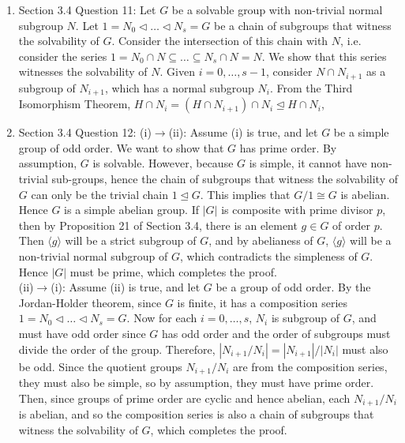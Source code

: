 \documentclass{article}
\begin{document}
\begin{enumerate}
  \item Section 3.4 Question 11: Let $G$ be a solvable group with
    non-trivial normal subgroup $N$. Let
    $1=N_0\triangleleft\ldots\triangleleft N_s=G$ be a chain of subgroups
    that witness the solvability of $G$. Consider the intersection of this
    chain with $N$, i.e. consider the series $1=N_0\cap
    N\subseteq\ldots\subseteq N_s\cap N=N$. We show that this series
    witnesses the solvability of $N$. Given $i=0,\ldots,s-1$, consider
    $N\cap N_{i+1}$ as a subgroup of $N_{i+1}$, which has a normal
    subgroup $N_i$. From the Third Isomorphism Theorem, $H\cap
    N_i=(H\cap N_{i+1})\cap N_i\trianglelefteq H\cap N_i$,

  \item Section 3.4 Question 12: (i)$\rightarrow$(ii): Assume (i) is true,
    and let $G$ be a simple group of odd order. We want to show that $G$
    has prime order. By assumption, $G$ is solvable. However, because $G$
    is simple, it cannot have non-trivial sub-groups, hence the chain of
    subgroups that witness the solvability of $G$ can only be the trivial
    chain $1\trianglelefteq G$. This implies that $G/1\cong G$ is abelian.
    Hence $G$ is a simple abelian group. If $|G|$ is composite with prime
    divisor $p$, then by Proposition 21 of Section 3.4, there is an element
    $g\in G$ of order $p$. Then $\langle g\rangle$ will be a strict subgroup
    of $G$, and by abelianess of $G$, $\langle g\rangle$ will be a
    non-trivial normal subgroup of $G$, which contradicts the simpleness of
    $G$. Hence $|G|$ must be prime, which completes the proof. \\

    (ii)$\rightarrow$(i): Assume (ii) is true, and let $G$ be a group of
    odd order. By the Jordan-Holder theorem, since $G$ is finite, it has a
    composition series $1=N_0\triangleleft\ldots\triangleleft N_s=G$. Now
    for each $i=0,\ldots,s$, $N_i$ is subgroup of $G$, and must have odd
    order since $G$ has odd order and the order of subgroups must divide
    the order of the group. Therefore, $|N_{i+1}/N_{i}|=|N_{i+1}|/|N_i|$
    must also be odd. Since the quotient groups $N_{i+1}/N_{i}$ are from
    the composition series, they must also be simple, so by assumption,
    they must have prime order. Then, since groups of prime order are
    cyclic and hence abelian, each $N_{i+1}/N_{i}$ is abelian, and so the
    composition series is also a chain of subgroups that witness the
    solvability of $G$, which completes the proof.
\end{enumerate}
\end{document}
